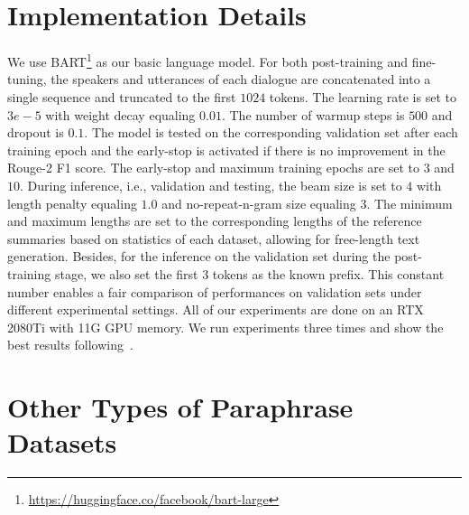 \section{Implementation Details}
\label{sec:details}
We use BART\footnote{\url{https://huggingface.co/facebook/bart-large}} as our basic language model. For both post-training and fine-tuning, the speakers and utterances of each dialogue are concatenated into a single sequence and truncated to the first $1024$ tokens.
The learning rate is set to $3e-5$ with weight decay equaling $0.01$. The number of warmup steps is $500$ and dropout is $0.1$. The model is tested on the corresponding validation set after each training epoch and %
the early-stop is activated if there is no improvement in the Rouge-2 F1 score.
The early-stop and maximum training epochs are set to $3$ and $10$.
During inference, i.e., validation and testing,
the beam size is set to $4$ with length penalty equaling $1.0$
and no-repeat-n-gram size equaling $3$. 
The minimum and maximum lengths are set to the corresponding lengths
of the reference summaries based on statistics of each dataset, allowing for free-length text generation.
Besides, for the inference on the validation set during the post-training stage, we also set the first $3$ tokens as the known prefix. This constant number enables a fair comparison of performances on validation sets under different experimental settings.
All of our experiments are done on an RTX 2080Ti with 11G GPU
memory. We run experiments three times and show the best results following~\cite{feng-etal-2021-language}. 


\section{Other Types of Paraphrase Datasets}
\label{sec:para}

